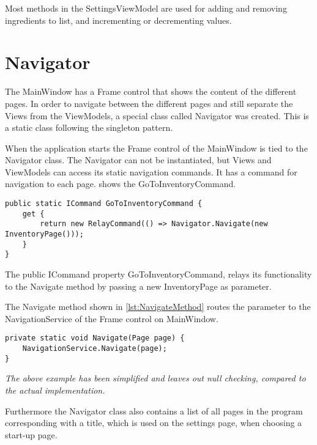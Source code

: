 Most methods in the SettingsViewModel are used for adding and removing ingredients to list, and incrementing or decrementing values.

\chapter{Navigator} \label{NavigatorLabel}
The MainWindow has a Frame control that shows the content of the different pages. In order to navigate between the different pages and still separate the Views from the ViewModels, a special class called Navigator was created. This is a static class following the singleton pattern. 

When the application starts the Frame control of the MainWindow is tied to the Navigator class.
The Navigator can not be instantiated, but Views and ViewModels can access its static navigation commands. It has a command for navigation to each page.  shows the GoToInventoryCommand.

\begin{lstlisting}[caption=GoToInventoryCommand, label={lst:InventoryCommand}, language=CSharp]
public static ICommand GoToInventoryCommand {
	get {
		return new RelayCommand(() => Navigator.Navigate(new InventoryPage()));
	}
}
\end{lstlisting}

The public ICommand property GoToInventoryCommand, relays its functionality to the Navigate method by passing a new InventoryPage as parameter.

The Navigate method shown in \cref{lst:NavigateMethod} routes the parameter to the NavigationService of the Frame control on MainWindow.

\begin{lstlisting}[caption=Navigate method, label={lst:NavigateMethod}, language=CSharp]
private static void Navigate(Page page) {
	NavigationService.Navigate(page);
}
\end{lstlisting}

\textit{The above example has been simplified and leaves out null checking, compared to the actual implementation.}

Furthermore the Navigator class also contains a list of all pages in the program corresponding with a title, which is used on the settings page, when choosing a start-up page.

